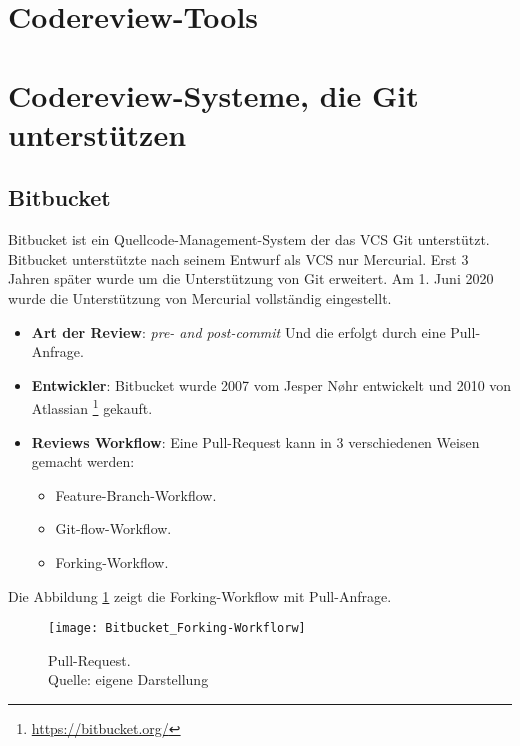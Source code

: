 \section{Codereview-Tools}
\label{sec:Coderview}

\blindtext
\blindtext

\section{Codereview-Systeme, die Git unterstützen}
\label{sec:CRS-Git}

\subsection{Bitbucket}
\label{subsec:Bitbucket}

Bitbucket ist ein Quellcode-Management-System der das \ac{VCS} Git unterstützt. Bitbucket unterstützte nach seinem Entwurf als \ac{VCS} nur Mercurial. Erst 3 Jahren später wurde um die Unterstützung von Git erweitert. Am 1. Juni 2020 wurde die Unterstützung von Mercurial vollständig eingestellt.

\begin{itemize}
	\item \textbf{Art der Review}: \textit{pre- and post-commit} Und die erfolgt durch eine Pull-Anfrage.
	\item \textbf{Entwickler}: Bitbucket wurde 2007 vom Jesper Nøhr entwickelt und 2010 von Atlassian \footnote{\url{https://bitbucket.org/}}
		 gekauft. 
	\item \textbf{Reviews Workflow}: Eine Pull-Request kann in 3 verschiedenen Weisen gemacht werden:
		\begin{itemize}
			\item Feature-Branch-Workflow.
			\item Git-flow-Workflow.
			\item Forking-Workflow.
		\end{itemize}
\end{itemize}

Die Abbildung \ref{fig:Forking-workflow} zeigt die Forking-Workflow mit Pull-Anfrage.

\begin{figure}[H]
	\centering
	\texttt{[image: Bitbucket\_Forking-Workflorw]}
	\caption[Bitbuckets Ablauf]{Pull-Request.\\ Quelle: eigene Darstellung}
	\label{fig:Forking-workflow}
\end{figure}		  

